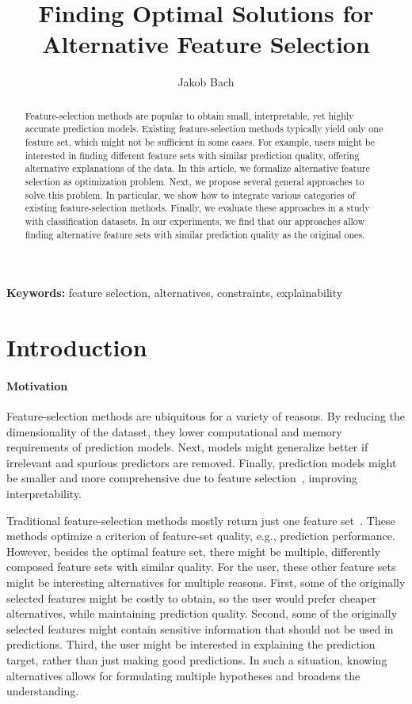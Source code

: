 \documentclass{article}
\title{Finding Optimal Solutions for Alternative Feature Selection}
\author{Jakob Bach}
\theoremstyle{definition}
\begin{document}
\maketitle

\begin{abstract}
Feature-selection methods are popular to obtain small, interpretable, yet highly accurate prediction models.
Existing feature-selection methods typically yield only one feature set, which might not be sufficient in some cases.
For example, users might be interested in finding different feature sets with similar prediction quality, offering alternative explanations of the data.
In this article, we formalize alternative feature selection as optimization problem.
Next, we propose several general approaches to solve this problem.
In particular, we show how to integrate various categories of existing feature-selection methods.
Finally, we evaluate these approaches in a study with classification datasets.
In our experiments, we find that our approaches allow finding alternative feature sets with similar prediction quality as the original ones.
\end{abstract}

\textbf{Keywords:} feature selection, alternatives, constraints, explainability

\section{Introduction}
\label{sec:introduction}

\paragraph{Motivation}

Feature-selection methods are ubiquitous for a variety of reasons.
By reducing the dimensionality of the dataset, they lower computational and memory requirements of prediction models.
Next, models might generalize better if irrelevant and spurious predictors are removed.
Finally, prediction models might be smaller and more comprehensive due to feature selection~\cite{li2017feature}, improving interpretability.

Traditional feature-selection methods mostly return just one feature set~\cite{borboudakis2021extending}.
These methods optimize a criterion of feature-set quality, e.g., prediction performance.
However, besides the optimal feature set, there might be multiple, differently composed feature sets with similar quality.
For the user, these other feature sets might be interesting alternatives for multiple reasons.
First, some of the originally selected features might be costly to obtain, so the user would prefer cheaper alternatives, while maintaining prediction quality.
Second, some of the originally selected features might contain sensitive information that should not be used in predictions.
Third, the user might be interested in explaining the prediction target, rather than just making good predictions.
In such a situation, knowing alternatives allows for formulating multiple hypotheses and broadens the understanding.
\end{document}
